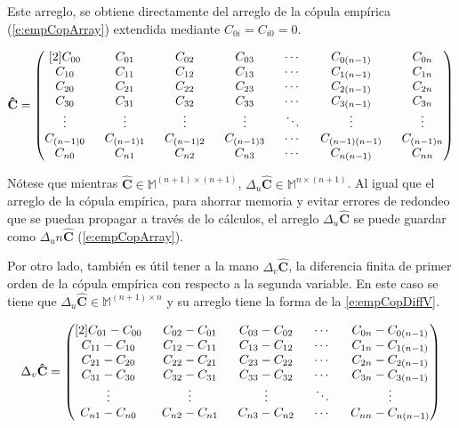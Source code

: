 Este arreglo, se obtiene directamente del arreglo de la c\'opula emp\'irica (\autoref{e:empCopArray}) extendida mediante $C_{0i}=C_{i0}=0$.

\begin{equation}
\setlength\arraycolsep{8pt}
	\mathbf{\hat{C}} =
	\begin{pmatrix}[2]
		C_{00} & C_{01} & C_{02} & C_{03} & \cdots & C_{0(n-1)} & C_{0n}\\
		C_{10} & C_{11} & C_{12} & C_{13} & \cdots & C_{1(n-1)} & C_{1n}\\
		C_{20} & C_{21} & C_{22} & C_{23} & \cdots & C_{2(n-1)} & C_{2n}\\
		C_{30} & C_{31} & C_{32} & C_{33} & \cdots & C_{3(n-1)} & C_{3n}\\
		\vdots  & \vdots  & \vdots  & \vdots  & \ddots & \vdots & \vdots \\
		C_{(n-1)0} & C_{(n-1)1} & C_{(n-1)2} & C_{(n-1)3} & \cdots & C_{(n-1)(n-1)} & C_{(n-1)n}\\
		C_{n0} & C_{n1} & C_{n2} & C_{n3} & \cdots & C_{n(n-1)} & C_{nn}\\
		\end{pmatrix}
	\label{e:empCopArrayExt}
\end{equation}

N\'otese que mientras $\mathbf{\hat{C}} \in \mathbb{M}^{(n+1) \times (n+1)}$, $\Delta_u \mathbf{\hat{C}} \in \mathbb{M}^{n \times (n+1)}$. Al igual que el arreglo de la c\'opula emp\'irica, para ahorrar memoria y evitar errores de redondeo que se puedan propagar a trav\'es de lo c\'alculos, el arreglo $\Delta_u \mathbf{\hat{C}}$ se puede guardar como $\Delta_u n\mathbf{\hat{C}}$ (\autoref{e:empCopArray}).

Por otro lado, tambi\'en es \'util tener a la mano $\Delta_v \mathbf{\hat{C}}$, la diferencia finita de primer orden de la c\'opula emp\'irica con respecto a la segunda variable. En este caso se tiene que $\Delta_u \mathbf{\hat{C}} \in \mathbb{M}^{(n+1) \times n}$ y su arreglo tiene la forma de la \autoref{e:empCopDiffV}. 

\begin{equation}
\setlength\arraycolsep{8pt}
\Delta_v \mathbf{\hat{C}}=
	\begin{pmatrix}[2]
		C_{01}-C_{00} & C_{02}-C_{01} & C_{03}-C_{02} & \cdots & C_{0n} - C_{0(n-1)} \\
		C_{11}-C_{10} & C_{12}-C_{11} & C_{13}-C_{12} & \cdots & C_{1n} - C_{1(n-1)} \\ 
		C_{21}-C_{20} & C_{22}-C_{21} & C_{23}-C_{22} & \cdots & C_{2n} - C_{2(n-1)} \\ 
		C_{31}-C_{30} & C_{32}-C_{31} & C_{33}-C_{32} & \cdots & C_{3n} - C_{3(n-1)} \\ 
		\vdots & \vdots & \vdots & \ddots & \vdots \\
		C_{n1}-C_{n0} & C_{n2}-C_{n1} & C_{n3}-C_{n2} & \cdots & C_{nn} - C_{n(n-1)} \\ 
	\end{pmatrix}
	\label{e:empCopDiffV}
\end{equation}

